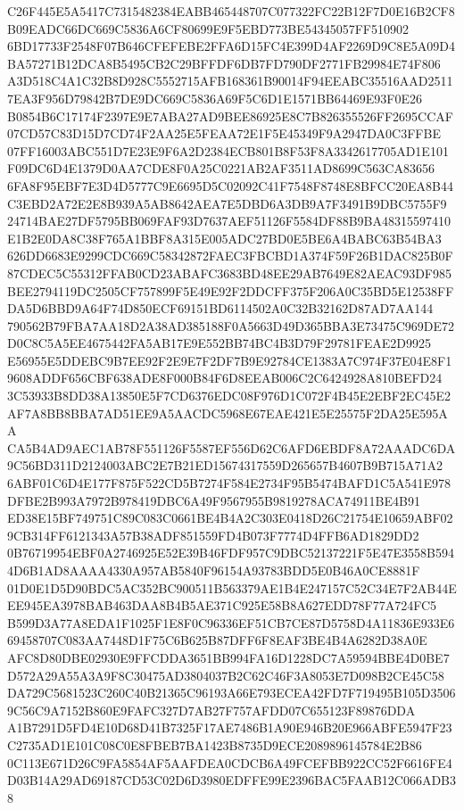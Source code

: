\documentclass[UTF8,fontset=fandol,zihao=-4,a4paper]{ctexart}
\begin{document}
{{C26F445E5A5417C7315482384EABB465448707C077322FC22B12F7D0E16B2CF8B09EADC66DC669C5836A6CF80699E9F5EBD773BE54345057FF510902
6BD17733F2548F07B646CFEFEBE2FFA6D15FC4E399D4AF2269D9C8E5A09D4BA57271B12DCA8B5495CB2C29BFFDF6DB7FD790DF2771FB29984E74F806
A3D518C4A1C32B8D928C5552715AFB168361B90014F94EEABC35516AAD25117EA3F956D79842B7DE9DC669C5836A69F5C6D1E1571BB64469E93F0E26
B0854B6C17174F2397E9E7ABA27AD9BEE86925E8C7B826355526FF2695CCAF07CD57C83D15D7CD74F2AA25E5FEAA72E1F5E45349F9A2947DA0C3FFBE
07FF16003ABC551D7E23E9F6A2D2384ECB801B8F53F8A3342617705AD1E101F09DC6D4E1379D0AA7CDE8F0A25C0221AB2AF3511AD8699C563CA83656
6FA8F95EBF7E3D4D5777C9E6695D5C02092C41F7548F8748E8BFCC20EA8B44C3EBD2A72E2E8B939A5AB8642AEA7E5DBD6A3DB9A7F3491B9DBC5755F9
24714BAE27DF5795BB069FAF93D7637AEF51126F5584DF88B9BA48315597410E1B2E0DA8C38F765A1BBF8A315E005ADC27BD0E5BE6A4BABC63B54BA3
626DD6683E9299CDC669C58342872FAEC3FBCBD1A374F59F26B1DAC825B0F87CDEC5C55312FFAB0CD23ABAFC3683BD48EE29AB7649E82AEAC93DF985
BEE2794119DC2505CF757899F5E49E92F2DDCFF375F206A0C35BD5E12538FFDA5D6BBD9A64F74D850ECF69151BD6114502A0C32B32162D87AD7AA144
790562B79FBA7AA18D2A38AD385188F0A5663D49D365BBA3E73475C969DE72D0C8C5A5EE4675442FA5AB17E9E552BB74BC4B3D79F29781FEAE2D9925
E56955E5DDEBC9B7EE92F2E9E7F2DF7B9E92784CE1383A7C974F37E04E8F19608ADDF656CBF638ADE8F000B84F6D8EEAB006C2C6424928A810BEFD24
3C53933B8DD38A13850E5F7CD6376EDC08F976D1C072F4B45E2EBF2EC45E2AF7A8BB8BBA7AD51EE9A5AACDC5968E67EAE421E5E25575F2DA25E595AA
CA5B4AD9AEC1AB78F551126F5587EF556D62C6AFD6EBDF8A72AAADC6DA9C56BD311D2124003ABC2E7B21ED15674317559D265657B4607B9B715A71A2
6ABF01C6D4E177F875F522CD5B7274F584E2734F95B5474BAFD1C5A541E978DFBE2B993A7972B978419DBC6A49F9567955B9819278ACA74911BE4B91
ED38E15BF749751C89C083C0661BE4B4A2C303E0418D26C21754E10659ABF029CB314FF6121343A57B38ADF851559FD4B073F7774D4FFB6AD1829DD2
0B76719954EBF0A2746925E52E39B46FDF957C9DBC52137221F5E47E3558B5944D6B1AD8AAAA4330A957AB5840F96154A93783BDD5E0B46A0CE8881F
01D0E1D5D90BDC5AC352BC900511B563379AE1B4E247157C52C34E7F2AB44EEE945EA3978BAB463DAA8B4B5AE371C925E58B8A627EDD78F77A724FC5
B599D3A77A8EDA1F1025F1E8F0C96336EF51CB7CE87D5758D4A11836E933E669458707C083AA7448D1F75C6B625B87DFF6F8EAF3BE4B4A6282D38A0E
AFC8D80DBE02930E9FFCDDA3651BB994FA16D1228DC7A59594BBE4D0BE7D572A29A55A3A9F8C30475AD3804037B2C62C46F3A8053E7D098B2CE45C58
DA729C5681523C260C40B21365C96193A66E793ECEA42FD7F719495B105D35069C56C9A7152B860E9FAFC327D7AB27F757AFDD07C655123F89876DDA
A1B7291D5FD4E10D68D41B7325F17AE7486B1A90E946B20E966ABFE5947F23C2735AD1E101C08C0E8FBEB7BA1423B8735D9ECE2089896145784E2B86
0C113E671D26C9FA5854AF5AAFDEA0CDCB6A49FCEFBB922CC52F6616FE4D03B14A29AD69187CD53C02D6D3980EDFFE99E2396BAC5FAAB12C066ADB38
}}
\end{document}
